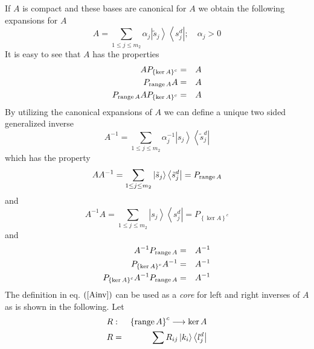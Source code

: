 If $A$ is compact and these bases are canonical for $A$ we obtain the
following expansions for $A$ 
\begin{equation}
A=\sum_{1\leq j\leq m_{2}}\alpha _{j}\left\vert \tilde{s}_{j}\right\rangle
\left\langle s_{j}^{d}\right\vert ;\quad \alpha _{j}>0
\end{equation}%
It is easy to see that $A$ has the properties 
\begin{eqnarray}
AP_{\left\{ \ker A\right\} ^{c}} &=&A  \nonumber \\
P_{%
\mathop{\rm range}%
A}A &=&A  \nonumber \\
P_{%
\mathop{\rm range}%
A}AP_{\left\{ \ker A\right\} ^{c}} &=&A
\end{eqnarray}%
By utilizing the canonical expansions of $A$ we can define a unique two
sided generalized inverse 
\begin{equation}
A^{-1}=\sum_{1\leq j\leq m_{2}}\alpha _{j}^{-1}\left\vert s_{j}\right\rangle
\left\langle \tilde{s}_{j}^{d}\right\vert  \label{Ainv}
\end{equation}%
which has the property 
\begin{equation}
AA^{-1}=\sum_{1\leq j\leq m_{2}}\left\vert \tilde{s}_{j}\right\rangle
\left\langle \tilde{s}_{j}^{d}\right\vert =P_{%
\mathop{\rm range}%
A}
\end{equation}%
and 
\begin{equation}
A^{-1}A=\sum_{1\leq j\leq m_{2}}\left\vert s_{j}\right\rangle \left\langle
s_{j}^{d}\right\vert =P_{\left\{ \ker A\right\} ^{c}}
\end{equation}%
and\ 
\begin{eqnarray}
A^{-1}P_{%
\mathop{\rm range}%
A} &=&A^{-1}  \nonumber \\
P_{\left\{ \ker A\right\} ^{c}}A^{-1} &=&A^{-1}  \nonumber \\
P_{\left\{ \ker A\right\} ^{c}}A^{-1}P_{%
\mathop{\rm range}%
A} &=&A^{-1}
\end{eqnarray}%
The definition in eq. $\left( \ref{Ainv}\right) $ can be used as a {\em core}
for left and right inverses of $A$ as is shown in the following. Let 
\begin{eqnarray}
R &:&\left\{ 
\mathop{\rm range}%
A\right\} ^{c}\longrightarrow \ker A  \nonumber \\
R &=&\sum R_{ij}\left\vert k_{i}\right\rangle \left\langle
l_{j}^{d}\right\vert
\end{eqnarray}%
